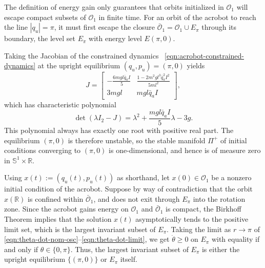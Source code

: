 \documentclass[journal,twoside,web, twocolumn,draftcls]{ieeecolor}
\newcommand*{\R}{\mathbb{R}}
\newcommand*{\Sone}{\mathbb{S}^1}
\newcommand*{\SxR}{\Sone \times \R}
\newcommand*{\Id}[1]{I_{#1}}
\begin{document}
The definition of energy gain only guarantees that orbits initialized in
\(\mathcal{O}_1\) will escape compact subsets of \(\mathcal{O}_1\) in finite
time. 
For an orbit of the acrobot to reach the line \(|q_u| = \pi\), it must first
escape the closure \(\bar{\mathcal{O}}_1 = \mathcal{O}_1 \cup E_\pi\) through
its boundary, the level set \(E_\pi\) with energy level \(E(\pi,0)\).

Taking the Jacobian of the constrained dynamics
~\eqref{eqn:acrobot-constrained-dynamics} at the upright equilibrium 
\((q_u,p_u) = (\pi,0)\) yields
\[
    J = \begin{bmatrix}
        -\frac{6mgl\bar{q}_aI}{5} & \frac{1 - 2m^2gl^3\bar{q}_a^2 I^2}{5ml^2} \\
        3mgl & mgl\bar{q}_aI
    \end{bmatrix}
    ,
\]
which has characteristic polynomial
\[
    \det\left(\lambda \Id{2} - J\right)
    = \lambda^2 + \frac{mgl\bar{q}_a I}{5} \lambda - 3g
    .
\]
This polynomial always has exactly one root with positive real part. 
The equilibrium \((\pi,0)\) is therefore unstable, so the stable manifold
\(\Pi^+\) of initial conditions converging to \((\pi,0)\) is one-dimensional,
and hence is of measure zero in \(\SxR\).

Using \(x(t) := (q_u(t),p_u(t))\) as shorthand, let
\(x(0) \in \mathcal{O}_1\) be a nonzero initial condition of the acrobot.
Suppose by way of contradiction that the orbit \(x(\R)\) is confined within 
\(\bar{\mathcal{O}}_1\), and does not exit through \(E_\pi\) into the rotation
zone.
Since the acrobot gains energy on \(\mathcal{O}_1\) and \(\bar{\mathcal{O}}_1\)
is compact, the Birkhoff Theorem \cite{birkhoff} implies that
the solution \(x(t)\) asymptotically tends to the positive limit set, which is
the largest invariant subset of \(E_\pi\).
Taking the limit as \(r \to \pi\) of
\eqref{eqn:theta-dot-nom-osc}--\eqref{eqn:theta-dot-limit},
we get \(\dot{\theta} \geq 0\) on \(E_\pi\) with equality if and only if
\(\theta \in \{0,\pi\}\).
Thus, the largest invariant subset of \(E_\pi\) is either the upright
equilibrium \(\{(\pi,0)\}\) or \(E_\pi\) itself.
\end{document}
